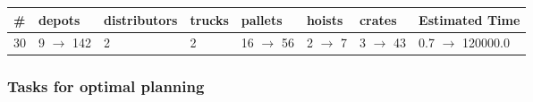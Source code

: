 \documentclass{article}
\begin{document}
                        \begin{center}
                        \begin{tabular}{@{}l|l|l|l|l|l|l|l@{}}
                        \# & depots & distributors & trucks & pallets & hoists & crates & Estimated Time\\\midrule
                        30&9 $\rightarrow$ 142&2&2&16 $\rightarrow$ 56&2 $\rightarrow$ 7&3 $\rightarrow$ 43&0.7 $\rightarrow$ 120000.0
                        \end{tabular}
                        \end{center}
                    
                                \subsubsection*{Tasks for optimal planning}
                                
\end{document}
